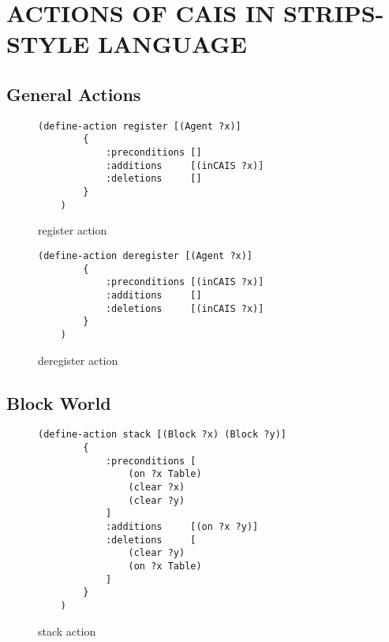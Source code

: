 
\appendix    %

\chapter{ACTIONS OF CAIS IN STRIPS-STYLE LANGUAGE}\label{apdx:strips}

\section{General Actions}

\begin{figure}[h]
\begin{lstlisting}[]
    (define-action register [(Agent ?x)]
        {
            :preconditions []
            :additions     [(inCAIS ?x)]
            :deletions     []
        }
    )
\end{lstlisting}
\caption{register action}
\end{figure}

\begin{figure}[h]
\begin{lstlisting}[]
    (define-action deregister [(Agent ?x)]
        {
            :preconditions [(inCAIS ?x)]
            :additions     []
            :deletions     [(inCAIS ?x)]
        }
    )
\end{lstlisting}
\caption{deregister action}
\end{figure}

\section{Block World}

\begin{figure}[h]
\begin{lstlisting}[]
    (define-action stack [(Block ?x) (Block ?y)]
        {
            :preconditions [
                (on ?x Table)
                (clear ?x)
                (clear ?y)
            ]
            :additions     [(on ?x ?y)]
            :deletions     [
                (clear ?y)
                (on ?x Table)
            ]
        }
    )
\end{lstlisting}
\caption{stack action}
\end{figure}

